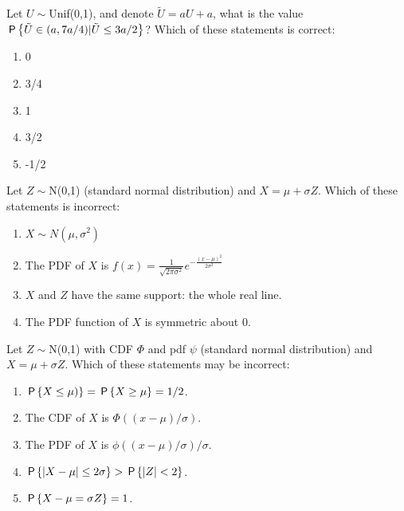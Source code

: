 \documentclass[poll_tutorial_format]{subfiles}
\begin{document}
	
	\begin{exercise}
	 	Let $U\sim $Unif(0,1), and denote $\tilde{U}=aU+a$, what is the value $\P{\tilde{U}\in(a,7a/4)|\tilde{U}\leq 3a/2}$?  
		Which of these statements is correct: 
		\begin{enumerate}
			\item 0
			\item 3/4
			\item 1
			\item 3/2
			\item -1/2 
		\end{enumerate}
	\end{exercise}
	
	
	\begin{exercise}
		Let $Z\sim$N(0,1) (standard normal distribution) and $X=\mu+\sigma Z$. 
		Which of these statements is incorrect: 
		\begin{enumerate}
			\item $X\sim N(\mu, \sigma^2)$
			\item The PDF of $X$ is $f(x)=\frac{1}{\sqrt{2\pi \sigma^2}} e^{-\frac{(x-\mu)^2 }{2\sigma^2 }}$
			\item $X$ and $Z$ have the same support: the whole real line.   
			\item The PDF function of $X$ is symmetric about 0.
		\end{enumerate}
	\end{exercise}
	

	\begin{exercise}
		Let $Z\sim$N(0,1) with CDF $\Phi$ and pdf $\psi$ (standard normal distribution) and $X=\mu+\sigma Z$. 
		Which of these statements may be incorrect: 
		\begin{enumerate}
			\item $\P{X\leq \mu)}=\P{X\geq \mu}=1/2$.
			\item The CDF of $X$ is $\Phi((x-\mu)/\sigma)$.
			\item The PDF of $X$ is $\phi((x-\mu)/\sigma)/\sigma$.
			\item $\P{|X-\mu|\leq 2\sigma} >\P{|Z|<2}$.
			\item $\P{X-\mu=\sigma Z}=1$.
		\end{enumerate}
	\end{exercise}
	
 
	
	
	
	
\end{document}
